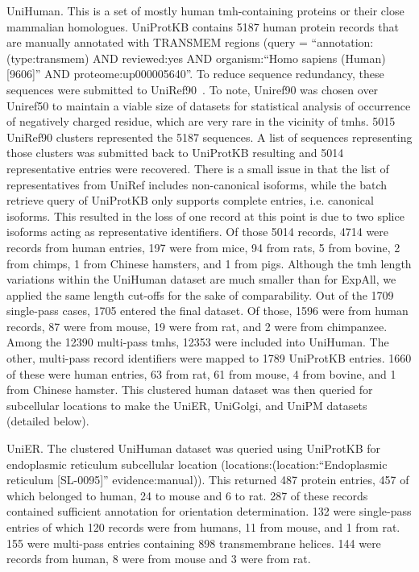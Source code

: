 UniHuman.
This is a set of mostly human \gls{tmh}-containing proteins or their close mammalian homologues.
UniProtKB contains 5187 human protein records that are manually annotated with TRANSMEM regions (query = ``annotation:(type:transmem) AND reviewed:yes AND organism:``Homo sapiens (Human) [9606]'' AND proteome:up000005640''.
To reduce sequence redundancy, these sequences were submitted to UniRef90~\cite{Suzek2015}.
To note, Uniref90 was chosen over Uniref50 to maintain a viable size of datasets for statistical analysis of occurrence of negatively charged residue, which are very rare in the vicinity of \gls{tmh}s.
5015 UniRef90 clusters represented the 5187 sequences.
A list of sequences representing those clusters was submitted back to UniProtKB resulting and 5014 representative entries were recovered.
There is a small issue in that the list of representatives from UniRef includes non-canonical isoforms, while the batch retrieve query of UniProtKB only supports complete entries, i.e.
canonical isoforms.
This resulted in the loss of one record at this point is due to two splice isoforms acting as representative identifiers.
Of those 5014 records, 4714 were records from human entries, 197 were from mice, 94 from rats, 5 from bovine, 2 from chimps, 1 from Chinese hamsters, and 1 from pigs.
Although the \gls{tmh} length variations within the UniHuman dataset are much smaller than for ExpAll, we applied the same length cut-offs for the sake of comparability.
Out of the 1709 single-pass cases, 1705 entered the final dataset.
Of those, 1596 were from human records, 87 were from mouse, 19 were from rat, and 2 were from chimpanzee.
Among the 12390 multi-pass \gls{tmh}s, 12353 were included into UniHuman.
The other, multi-pass record identifiers were mapped to 1789 UniProtKB entries.
1660 of these were human entries, 63 from rat, 61 from mouse, 4 from bovine, and 1 from Chinese hamster.
This clustered human dataset was then queried for subcellular locations to make the UniER, UniGolgi, and UniPM datasets (detailed below).

UniER.
The clustered UniHuman dataset was queried using UniProtKB for endoplasmic reticulum subcellular location (locations:(location:``Endoplasmic reticulum [SL-0095]'' evidence:manual)).
This returned 487 protein entries, 457 of which belonged to human, 24 to mouse and 6 to rat.
287 of these records contained sufficient annotation for orientation determination.
132 were single-pass entries of which 120 records were from humans, 11 from mouse, and 1 from rat.
155 were multi-pass entries containing 898 transmembrane helices.
144 were records from human, 8 were from mouse and 3 were from rat.

